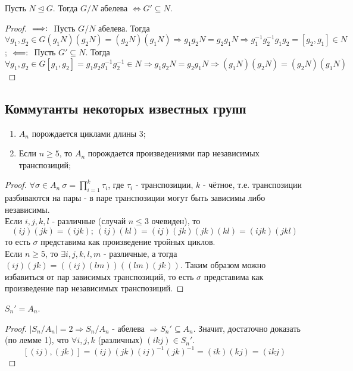 \begin{subtheorem}
    Пусть $N \unlhd G$. Тогда $G/N$ абелева $\Longleftrightarrow G' \subseteq N$.
\end{subtheorem}
\begin{proof}
    $\\\Longrightarrow: \ $ Пусть $G/N$ абелева. Тогда $\forall g_1, g_2 \in G (g_1N)(g_2N) = (g_2N)(g_1N) \Longrightarrow g_1g_2N = g_2g_1N \Longrightarrow g_1^{-1}g_2^{-1}g_1g_2 = [g_2, g_1] \in N$;
    $\\\Longleftarrow: \ $ Пусть $G' \subseteq N$. Тогда $\forall g_1, g_2 \in G [g_1, g_2] = g_1g_2g_1^{-1}g_2^{-1} \in N \Longrightarrow g_1g_2N = g_2g_1N \Longrightarrow (g_1N)(g_2N) = (g_2N)(g_1N)$
\end{proof}
\subsection{Коммутанты некоторых известных групп}
\begin{lemmanum}\tab
    \begin{enumerate}
        \item $A_n$ порождается циклами длины 3;
        \item Если $n \geqslant 5$, то $A_n$ порождается произведениями пар независимых транспозиций;
    \end{enumerate}    
\end{lemmanum}
\begin{proof}
    $\forall \sigma \in A_n \ \sigma = \prod \limits_{i=1}^k \tau_i$, где $\tau_i$ - транспозиции, $k$ - чётное, т.е. транспозиции разбиваются на пары - в паре транспозиции могут быть зависимы либо независимы.\\
    Если $i, j, k, l$ - различные (случай $n \leqslant 3$ очевиден), то
    \[(ij)(jk) = (ijk); \ (ij)(kl) = (ij)(jk)(jk)(kl) = (ijk)(jkl)\]
    то есть $\sigma$ представима как произведение тройных циклов.\\
    Если $n \geqslant 5$, то $\exists i, j, k, l, m$ - различные, а тогда $(ij)(jk) = ((ij)(lm))((lm)(jk))$. Таким образом можно избавиться от пар зависимых транспозиций, то есть $\sigma$ представима как произведение пар независимых транспозиций.
\end{proof}
\begin{subtheorem}
    $S_n' = A_n$.
\end{subtheorem}
\begin{proof}
    $|S_n / A_n| = 2 \Longrightarrow S_n / A_n$ - абелева $\Longrightarrow S_n' \subseteq A_n$.
    Значит, достаточно доказать (по лемме 1), что $\forall i, j, k$ (различных) $(ikj) \in S_n'$.
    \[[(ij), (jk)] = (ij)(jk)(ij)^{-1}(jk)^{-1} = (ik)(kj) = (ikj)\] 
\end{proof}
